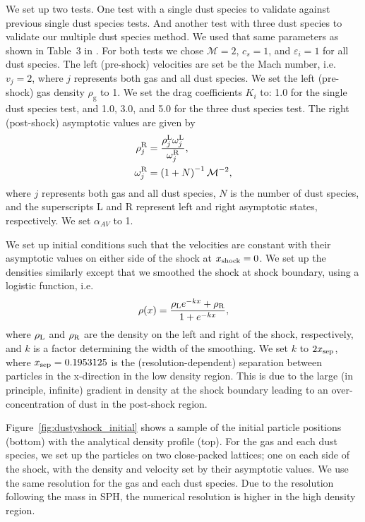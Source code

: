 \documentclass[fleqn,usenatbib]{mnras}
\newcommand{\g}{\mathrm{g}}
\begin{document}
We set up two tests. One test with a single dust species to validate against
previous single dust species tests. And another test with three dust species to
validate our multiple dust species method. We used that same parameters as shown
in Table~3 in \citet{Benitez-Llambay2019ApJS..241...25B}. For both tests we
chose \(\mathcal{M} = 2\), \(c_s = 1\), and \(\varepsilon_i = 1\) for all dust
species. The left (pre-shock) velocities are set be the Mach number, i.e. \(v_j=
2\), where \(j\) represents both gas and all dust species. We set the left
(pre-shock) gas density \(\rho_{\g}\) to 1. We set the drag coefficients \(K_i\)
to: 1.0 for the single dust species test, and 1.0, 3.0, and 5.0 for the three
dust species test. The right (post-shock) asymptotic values are given by
%
\begin{align}
   \rho_{j}^{\rm R} &=
      \frac{\rho_{j}^{\rm L} \omega_{j}^{\rm L}} {\omega_{j}^{\rm R}}, \\
   \omega_j^{\rm R} &= \left(1 + N \right)^{-1} \mathcal{M}^{-2},
\end{align}
%
where \(j\) represents both gas and all dust species, \(N\) is the number of
dust species, and the superscripts L and R represent left and right asymptotic
states, respectively. We set \(\alpha_{AV}\) to 1.

We set up initial conditions such that the velocities are constant with their
asymptotic values on either side of the shock at \(x_{\rm shock} = 0\). We set
up the densities similarly except that we smoothed the shock at shock boundary,
using a logistic function, i.e.
%
\begin{align}
   \rho(x) = \frac{\rho_{\rm L} e^{-kx} + \rho_{\rm R}}{1 + e^{-kx}},
\end{align}
%
where \(\rho_{\rm L}\) and \(\rho_{\rm R}\) are the density on the left and
right of the shock, respectively, and \(k\) is a factor determining the width of
the smoothing. We set \(k\) to \(2 x_{\rm sep}\), where \(x_{\rm sep} =
0.1953125\) is the (resolution-dependent) separation between particles in the
x-direction in the low density region. This is due to the large (in principle,
infinite) gradient in density at the shock boundary leading to an
over-concentration of dust in the post-shock region.

Figure~\ref{fig:dustyshock_initial} shows a sample of the initial particle
positions (bottom) with the analytical density profile (top). For the gas and
each dust species, we set up the particles on two close-packed lattices; one on
each side of the shock, with the density and velocity set by their asymptotic
values. We use the same resolution for the gas and each dust species. Due to the
resolution following the mass in SPH, the numerical resolution is higher in the
high density region.
\end{document}
